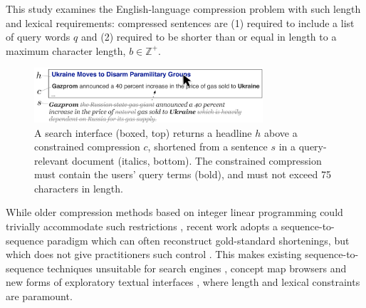 \documentclass[11pt,a4paper]{article}
\begin{document}
This study examines the English-language compression problem with such length and lexical requirements: compressed sentences are (1) required to include a list of query words $q$ and (2) required to be shorter than or equal in length to a maximum character length, $b \in \mathbb{Z}^{+}$. 

\begin{figure}[htb!]
\includegraphics[width=8.5cm]{qf.pdf}
\caption{A search interface (boxed, top) returns a headline $h$ above a constrained compression $c$, shortened from a sentence $s$ in a query-relevant document (italics, bottom). The constrained compression must contain the users' query terms (bold), and must not exceed 75 characters in length.}
\label{f:qf}
\end{figure}


While older compression methods based on integer linear programming could trivially accommodate such restrictions \cite{clarke2008global,filippova2013overcoming}, recent work adopts a sequence-to-sequence paradigm which can often reconstruct gold-standard shortenings, but which does not give practitioners such control \cite{filippova2015sentence}. This makes existing sequence-to-sequence techniques unsuitable for search engines \cite{hearst2009search}, concept map browsers \cite{falke2017graphdocexplore} and new forms of exploratory textual interfaces \cite{marchionini2006exploratory}, where length and lexical constraints are paramount. 
\end{document}
